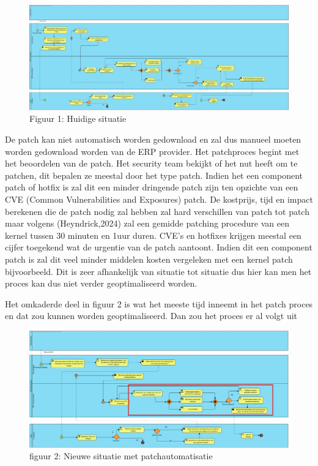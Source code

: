 \documentclass[dutch,dit,thesis]{hogentreport}
\begin{document}
\begin{figure}
    \centering
    \includegraphics[width=\textwidth]{huidigesituatie.jpg}
    \caption{Figuur 1: Huidige situatie}
    \label{fig:huidigesituatie}
\end{figure}

De patch kan niet automatisch worden gedownload en zal dus manueel moeten worden gedownload worden van de ERP provider. Het patchproces begint met het beoordelen van de patch. Het security team bekijkt of het nut heeft
om te patchen, dit bepalen ze meestal door het type patch. Indien het een component patch of hotfix is zal dit een minder dringende patch zijn ten opzichte van een CVE (Common Vulnerabilities and Exposures) patch. De kostprijs, tijd en impact berekenen
  die de patch nodig zal hebben zal hard verschillen van patch tot patch maar volgens (Heyndrick,2024) zal een gemidde patching procedure van een kernel tussen 30 minuten en 1uur duren. CVE's en hotfixes krijgen meestal een cijfer toegekend wat de urgentie van de patch aantoont. Indien dit een component patch is zal dit veel minder middelen kosten vergeleken
  met een kernel patch bijvoorbeeld. Dit is zeer afhankelijk van situatie tot situatie dus hier kan men het proces kan dus niet verder geoptimaliseerd worden.


 Het omkaderde deel in figuur 2 is wat het meeste tijd inneemt in het patch proces en dat zou kunnen worden geoptimaliseerd. Dan zou het proces er al volgt uit


 \begin{figure}[htbp]
    \centering
    \includegraphics[width=\textwidth]{huidigesituatie2.png}
    \caption{figuur 2: Nieuwe situatie met patchautomatisatie}
     \label{fig:huidigesituatie2}
\end{figure}
\end{document}
